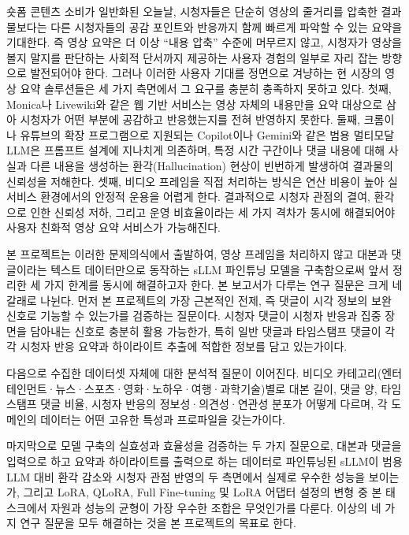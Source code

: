 \documentclass[11pt,a4paper]{article}
\begin{document}
숏폼 콘텐츠 소비가 일반화된 오늘날, 시청자들은 단순히 영상의 줄거리를 압축한 결과물보다는 다른 시청자들의 공감 포인트와 반응까지 함께 빠르게 파악할 수 있는 요약을 기대한다. 즉 영상 요약은 더 이상 ``내용 압축'' 수준에 머무르지 않고, 시청자가 영상을 볼지 말지를 판단하는 사회적 단서까지 제공하는 사용자 경험의 일부로 자리 잡는 방향으로 발전되어야 한다. 그러나 이러한 사용자 기대를 정면으로 겨냥하는 현 시장의 영상 요약 솔루션들은 세 가지 측면에서 그 요구를 충분히 충족하지 못하고 있다. 첫째, Monica나 Livewiki와 같은 웹 기반 서비스는 영상 자체의 내용만을 요약 대상으로 삼아 시청자가 어떤 부분에 공감하고 반응했는지를 전혀 반영하지 못한다. 둘째, 크롬이나 유튜브의 확장 프로그램으로 지원되는 Copilot이나 Gemini와 같은 범용 멀티모달 LLM은 프롬프트 설계에 지나치게 의존하며, 특정 시간 구간이나 댓글 내용에 대해 사실과 다른 내용을 생성하는 환각(Hallucination) 현상이 빈번하게 발생하여 결과물의 신뢰성을 저해한다. 셋째, 비디오 프레임을 직접 처리하는 방식은 연산 비용이 높아 실서비스 환경에서의 안정적 운용을 어렵게 한다. 결과적으로 시청자 관점의 결여, 환각으로 인한 신뢰성 저하, 그리고 운영 비효율이라는 세 가지 격차가 동시에 해결되어야 사용자 친화적 영상 요약 서비스가 가능해진다.

본 프로젝트는 이러한 문제의식에서 출발하여, 영상 프레임을 처리하지 않고 대본과 댓글이라는 텍스트 데이터만으로 동작하는 sLLM 파인튜닝 모델을 구축함으로써 앞서 정리한 세 가지 한계를 동시에 해결하고자 한다. 본 보고서가 다루는 연구 질문은 크게 네 갈래로 나뉜다. 먼저 본 프로젝트의 가장 근본적인 전제, 즉 댓글이 시각 정보의 보완 신호로 기능할 수 있는가를 검증하는 질문이다. 시청자 댓글이 시청자 반응과 집중 장면을 담아내는 신호로 충분히 활용 가능한가, 특히 일반 댓글과 타임스탬프 댓글이 각각 시청자 반응 요약과 하이라이트 추출에 적합한 정보를 담고 있는가이다.

다음으로 수집한 데이터셋 자체에 대한 분석적 질문이 이어진다. 비디오 카테고리(엔터테인먼트·뉴스·스포츠·영화·노하우·여행·과학기술)별로 대본 길이, 댓글 양, 타임스탬프 댓글 비율, 시청자 반응의 정보성·의견성·연관성 분포가 어떻게 다르며, 각 도메인의 데이터는 어떤 고유한 특성과 프로파일을 갖는가이다.

마지막으로 모델 구축의 실효성과 효율성을 검증하는 두 가지 질문으로, 대본과 댓글을 입력으로 하고 요약과 하이라이트를 출력으로 하는 데이터로 파인튜닝된 sLLM이 범용 LLM 대비 환각 감소와 시청자 관점 반영의 두 측면에서 실제로 우수한 성능을 보이는가, 그리고 LoRA, QLoRA, Full Fine-tuning 및 LoRA 어댑터 설정의 변형 중 본 태스크에서 자원과 성능의 균형이 가장 우수한 조합은 무엇인가를 다룬다. 이상의 네 가지 연구 질문을 모두 해결하는 것을 본 프로젝트의 목표로 한다.
\end{document}

